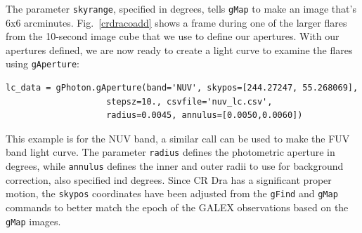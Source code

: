 \documentclass[preprint]{aastex}
\begin{document}
The parameter \texttt{skyrange}, specified in degrees, tells \texttt{gMap} to make an image that's 6x6 arcminutes.  Fig.\ \ref{crdracoadd} shows a frame during one of the larger flares from the 10-second image cube that we use to define our apertures.  With our apertures defined, we are now ready to create a light curve to examine the flares using \texttt{gAperture}:

\begin{verbatim}
lc_data = gPhoton.gAperture(band='NUV', skypos=[244.27247, 55.268069],
                    stepsz=10., csvfile='nuv_lc.csv',
                    radius=0.0045, annulus=[0.0050,0.0060])
\end{verbatim}

This example is for the NUV band, a similar call can be used to make the FUV band light curve.  The parameter \texttt{radius} defines the photometric aperture in degrees, while \texttt{annulus} defines the inner and outer radii to use for background correction, also specified ind degrees.  Since CR Dra has a significant proper motion, the \texttt{skypos} coordinates have been adjusted from the \texttt{gFind} and \texttt{gMap} commands to better match the epoch of the GALEX observations based on the \texttt{gMap} images.
\end{document}
